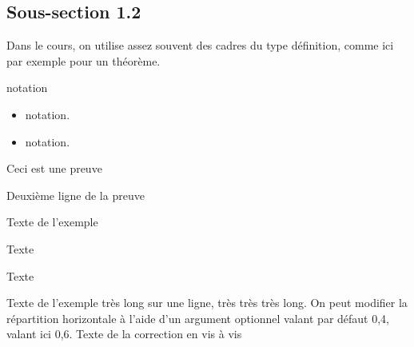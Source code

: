 \subsection{Sous-section 1.2}
\begin{theoreme}
  Dans le cours, on utilise assez souvent des cadres du type
  définition, comme ici par exemple pour un théorème.
\end{theoreme}
\begin{notation}
  notation
\end{notation}
\begin{notations}
  \begin{itemize}
    \item notation.
    \item notation.
  \end{itemize}
\end{notations}
\begin{preuve}
  Ceci est une preuve\par Deuxième ligne de la preuve
\end{preuve}
\begin{exemple}
  Texte de l’exemple
  \correction
  
\end{exemple}

\begin{exemple*1}
  \phantom{rrr}
  Texte

  \correction
  \phantom{rrr}
  Texte  
  
\end{exemple*1}

\begin{exemple}[0.6]
  Texte de l’exemple très long sur une ligne, très très très long.
  On peut modifier la répartition horizontale  à l'aide d'un argument optionnel valant par défaut 0,4, valant ici 0,6.
  \correction
  Texte de la correction en vis à vis
\end{exemple}
